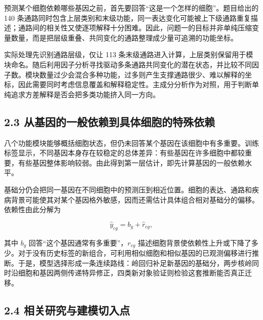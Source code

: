 预测某个细胞依赖哪些基因之前，首先要回答``这是一个怎样的细胞''。题目给出的 140 条通路同时包含上层类别和末级功能，同一表达变化可能被上下级通路重复描述；通路间的相关性又使逐项解释十分困难。因此，问题一的目标并非单纯压缩变量数量，而是把层级重叠、共同变化的通路整理成少量可追溯的功能坐标。

实际处理先识别通路层级，仅让 113 条末级通路进入计算，上层类别保留用于模块命名。随后利用因子分析寻找驱动多条通路共同变化的潜在状态，并比较不同因子数。模块数量过少会混合多种功能，过多则产生支撑通路很少、难以解释的坐标，因此需要同时考虑信息覆盖和解释稳定性。主成分分析作为对照，用于判断单纯追求方差解释是否会把多类功能挤入同一方向。

\hypertarget{23-ux4eceux57faux56e0ux7684ux4e00ux822cux4f9dux8d56ux5230ux5177ux4f53ux7ec6ux80deux7684ux7279ux6b8aux4f9dux8d56}{%
\subsection{2.3 从基因的一般依赖到具体细胞的特殊依赖}\label{23-ux4eceux57faux56e0ux7684ux4e00ux822cux4f9dux8d56ux5230ux5177ux4f53ux7ec6ux80deux7684ux7279ux6b8aux4f9dux8d56}}

八个功能模块能够概括细胞状态，但仍未回答某个基因在该细胞中有多重要。训练标签显示，不同基因本身存在较稳定的总体差异：有些基因在许多细胞中都较重要，有些基因整体影响较弱。由此得到第一层估计，即先计算基因的一般依赖水平。

基础分仍会把同一基因在不同细胞中的预测压到相近位置。细胞的表达、通路和疾病背景可能使其对某个基因格外敏感，因而还需估计具体组合相对基础分的偏移。依赖性由此分解为

\begin{equation}
\label{eq:dependency-decomposition}
\widehat y_{cg}=b_g+\widehat r_{cg},
\end{equation}

其中 \(b_g\) 回答``这个基因通常有多重要''，\(r_{cg}\) 描述细胞背景使依赖性上升或下降了多少。对于没有历史标签的新组合，可利用相似细胞和相似基因的已观测偏移进行推断。于是，模型选择形成一条连续路线：岭回归补足新基因的基础分，两步核岭同时沿细胞和基因两侧传递特异修正，四类新对象验证则检验这套推断能否真正迁移。

\hypertarget{24-ux76f8ux5173ux7814ux7a76ux4e0eux5efaux6a21ux5207ux5165ux70b9}{%
\subsection{2.4 相关研究与建模切入点}\label{24-ux76f8ux5173ux7814ux7a76ux4e0eux5efaux6a21ux5207ux5165ux70b9}}

